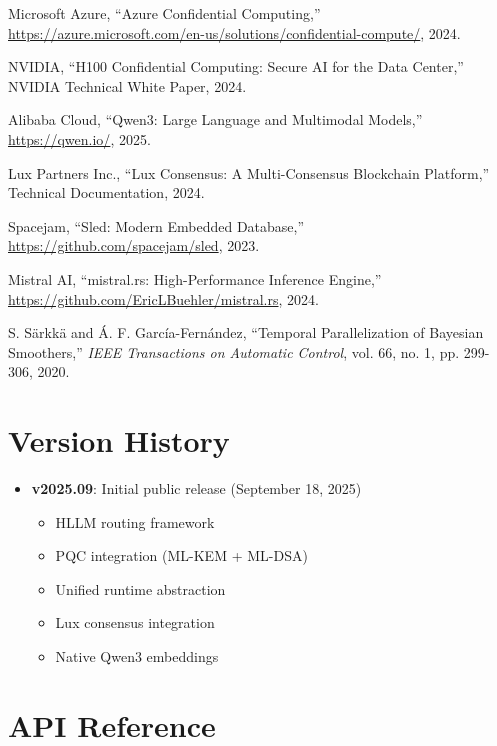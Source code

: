 \documentclass[11pt,twocolumn]{article}
\begin{document}
\begin{thebibliography}{99}
Microsoft Azure, ``Azure Confidential Computing,''
\url{https://azure.microsoft.com/en-us/solutions/confidential-compute/}, 2024.

NVIDIA, ``H100 Confidential Computing: Secure AI for the Data Center,''
NVIDIA Technical White Paper, 2024.

Alibaba Cloud, ``Qwen3: Large Language and Multimodal Models,''
\url{https://qwen.io/}, 2025.

Lux Partners Inc., ``Lux Consensus: A Multi-Consensus Blockchain Platform,''
Technical Documentation, 2024.

Spacejam, ``Sled: Modern Embedded Database,''
\url{https://github.com/spacejam/sled}, 2023.

Mistral AI, ``mistral.rs: High-Performance Inference Engine,''
\url{https://github.com/EricLBuehler/mistral.rs}, 2024.

S. Särkkä and Á. F. García-Fernández, ``Temporal Parallelization of Bayesian Smoothers,''
\textit{IEEE Transactions on Automatic Control}, vol. 66, no. 1, pp. 299-306, 2020.

\end{thebibliography}

\section*{Version History}

\begin{itemize}
\item \textbf{v2025.09}: Initial public release (September 18, 2025)
  \begin{itemize}
  \item HLLM routing framework
  \item PQC integration (ML-KEM + ML-DSA)
  \item Unified runtime abstraction
  \item Lux consensus integration
  \item Native Qwen3 embeddings
  \end{itemize}
\end{itemize}

\appendix

\section{API Reference}
\end{document}

